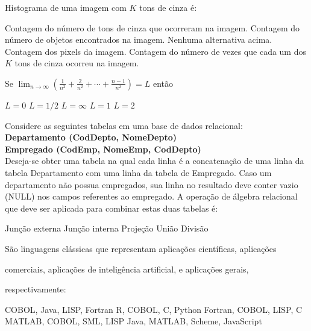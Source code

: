 \documentclass[12pt, addpoints]{exam}
\begin{document}
\begin{questions}
Histograma de uma imagem com \( K \) tons de cinza é:
\begin{choices}
\choice Contagem do número de tons de cinza que ocorreram na imagem.
\choice Contagem do número de objetos encontrados na imagem.
\choice Nenhuma alternativa acima.
\choice Contagem dos pixels da imagem.
\choice Contagem do número de vezes que cada um dos \( K \) tons de cinza ocorreu na imagem.
\end{choices}

\question

Se \( \lim_{n \to \infty} \left( \frac{1}{n^2} + \frac{2}{n^2} + \cdots + \frac{n-1}{n^2} \right) = L \) então


\begin{choices}
\choice \( L = 0 \)
\choice \( L = 1/2 \)
\choice \( L = \infty \)
\choice \( L = 1 \)
\choice \( L = 2 \)
\end{choices}

\question

Considere as seguintes tabelas em uma base de dados relacional:\\

\textbf{Departamento (CodDepto, NomeDepto)}\\

\textbf{Empregado (CodEmp, NomeEmp, CodDepto)}\\

Deseja-se obter uma tabela na qual cada linha é a concatenação de uma linha da tabela Departamento com uma linha da tabela de Empregado. Caso um departamento não possua empregados, sua linha no resultado deve conter vazio (NULL) nos campos referentes ao empregado. A operação de álgebra relacional que deve ser aplicada para combinar estas duas tabelas é:
\begin{choices}
\choice Junção externa
\choice Junção interna
\choice Projeção
\choice União
\choice Divisão
\end{choices}

\question

São linguagens clássicas que representam aplicações científicas, aplicações 

comerciais, aplicações de inteligência artificial, e aplicações gerais,

respectivamente:
\begin{choices}
\choice COBOL, Java, LISP, Fortran
\choice R, COBOL, C, Python
\choice Fortran, COBOL, LISP, C
\choice MATLAB, COBOL, SML, LISP
\choice Java, MATLAB, Scheme, JavaScript
\end{choices}


\end{questions}
\end{document}
